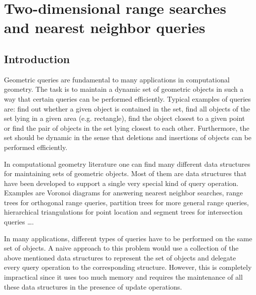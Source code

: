 
\ccParDims

\chapter{Two-dimensional range searches and nearest neighbor queries}
\label{chapterPoint_set_2}


\section{Introduction}

Geometric queries are fundamental to many applications in computational
geometry. The task is to maintain a dynamic set of geometric objects
in such a way that certain queries can be performed efficiently.
Typical examples of queries are:
find out whether a given object is contained in the set,
find all objects of the set lying in a given area (e.g. rectangle),
find the object closest to a given point or
find the pair of objects in the set lying closest to each other. 
Furthermore, the set should be dynamic in the sense that deletions and 
insertions of objects can be performed efficiently.

In computational geometry literature one can find many different data structures for
maintaining sets of geometric objects. Most of them are data structures 
that have been developed to support a single very special kind of query 
operation.
Examples are Voronoi diagrams for answering nearest neighbor
searches, range trees for orthogonal range queries, partition trees
for more general range queries, hierarchical triangulations for point
location and segment trees for intersection queries \dots.

In many applications, different types of queries have to be
performed on the same set of objects. A naive approach to this
problem would use a collection of the above mentioned data structures to
represent the set of objects and delegate every query operation to
the corresponding structure.
However, this is completely impractical since it uses too much
memory and requires the maintenance of all these data structures in the presence of
update operations.

